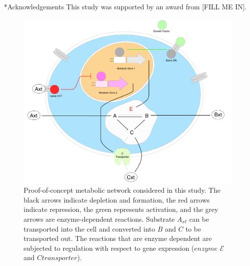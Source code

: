 \documentclass[12pt]{article}
\makeatletter
\renewcommand\section{\@startsection
	{subsection}{2}{0mm}
	{-0.2in}
	{0.05\baselineskip}
	{\normalfont\large\bfseries}}
\makeatother
\begin{document}

\clearpage


\section*{Acknowledgements}
This study was supported by an award from [FILL ME IN].
\clearpage




\clearpage

\clearpage

\begin{figure}[h]
\centering
\includegraphics[width=1.0\textwidth]{./Figures/Figure1_POC_Schematic.pdf}
\caption{Proof-of-concept metabolic network considered in this study. The black arrows indicate depletion and formation, the red arrows indicate repression, the green represents activation, and the grey arrows are enzyme-dependent reactions. Substrate $A_{xt}$ can be transported into the cell and converted into $B$ and $C$ to be transported out. The reactions that are enzyme dependent are subjected to regulation with respect to gene expression ($enzyme$ $\mathcal{E}$ and $C transporter$).
}\label{fig1-schematic}
\end{figure}
\end{document}
